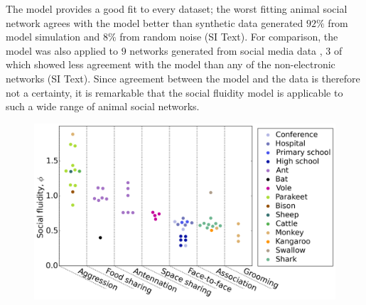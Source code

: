 \documentclass[twocolumn,8pt]{article}
\begin{document}
The model provides a good fit to every dataset; the worst fitting animal social network agrees with the model better than synthetic data generated $92\%$ from model simulation and $8\%$ from random noise (SI Text). For comparison, the model was also applied to $9$ networks generated from social media data \cite{Charlton160162}, $3$ of which showed less agreement with the model than any of the non-electronic networks (SI Text). Since agreement between the model and the data is therefore not a certainty, it is remarkable that the social fluidity model is applicable to such a wide range of animal social networks.

\begin{figure}[t]
\centering
\includegraphics[width=\linewidth]{Figures/interaction_types.png}
\label{phi_for_all_networks}
\end{figure}
\end{document}
